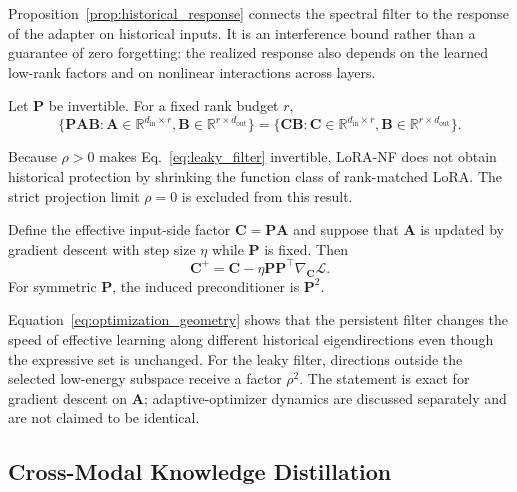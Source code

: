 Proposition~\ref{prop:historical_response} connects the spectral filter to the response of the adapter on historical inputs. It is an interference bound rather than a guarantee of zero forgetting: the realized response also depends on the learned low-rank factors and on nonlinear interactions across layers.

\begin{proposition}
\label{prop:expressive_equivalence}
Let $\mathbf{P}$ be invertible. For a fixed rank budget $r$,
\begin{equation}
    \{\mathbf{P}\mathbf{A}\mathbf{B}:\mathbf{A}\in\mathbb{R}^{d_{\mathrm{in}}\times r},
      \mathbf{B}\in\mathbb{R}^{r\times d_{\mathrm{out}}}\}
    =
    \{\mathbf{C}\mathbf{B}:\mathbf{C}\in\mathbb{R}^{d_{\mathrm{in}}\times r},
      \mathbf{B}\in\mathbb{R}^{r\times d_{\mathrm{out}}}\}.
    \label{eq:expressive_set}
\end{equation}
\end{proposition}

Because $\rho>0$ makes Eq.~\eqref{eq:leaky_filter} invertible, LoRA-NF does not obtain historical protection by shrinking the function class of rank-matched LoRA. The strict projection limit $\rho=0$ is excluded from this result.

\begin{proposition}
\label{prop:optimization_geometry}
Define the effective input-side factor $\mathbf{C}=\mathbf{P}\mathbf{A}$ and suppose that $\mathbf{A}$ is updated by gradient descent with step size $\eta$ while $\mathbf{P}$ is fixed. Then
\begin{equation}
    \mathbf{C}^{+}
    =\mathbf{C}-\eta\mathbf{P}\mathbf{P}^\top\nabla_{\mathbf{C}}\mathcal{L}.
    \label{eq:optimization_geometry}
\end{equation}
For symmetric $\mathbf{P}$, the induced preconditioner is $\mathbf{P}^2$.
\end{proposition}

Equation~\eqref{eq:optimization_geometry} shows that the persistent filter changes the speed of effective learning along different historical eigendirections even though the expressive set is unchanged. For the leaky filter, directions outside the selected low-energy subspace receive a factor $\rho^2$. The statement is exact for gradient descent on $\mathbf{A}$; adaptive-optimizer dynamics are discussed separately and are not claimed to be identical.

\subsection{Cross-Modal Knowledge Distillation}
\label{sec:distillation}

